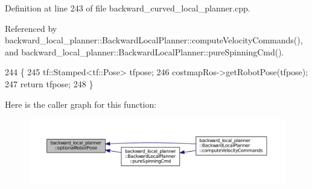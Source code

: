 Definition at line 243 of file backward\+\_\+curved\+\_\+local\+\_\+planner.\+cpp.



Referenced by backward\+\_\+local\+\_\+planner\+::\+Backward\+Local\+Planner\+::compute\+Velocity\+Commands(), and backward\+\_\+local\+\_\+planner\+::\+Backward\+Local\+Planner\+::pure\+Spinning\+Cmd().


\begin{DoxyCode}
244 \{
245     tf::Stamped<tf::Pose> tfpose;
246     costmapRos->getRobotPose(tfpose);
247     \textcolor{keywordflow}{return} tfpose;
248 \}
\end{DoxyCode}


Here is the caller graph for this function\+:
\nopagebreak
\begin{figure}[H]
\begin{center}
\leavevmode
\includegraphics[width=350pt]{namespacebackward__local__planner_a6c2eb91307e14f740b0bec1248dfe1c7_icgraph}
\end{center}
\end{figure}


